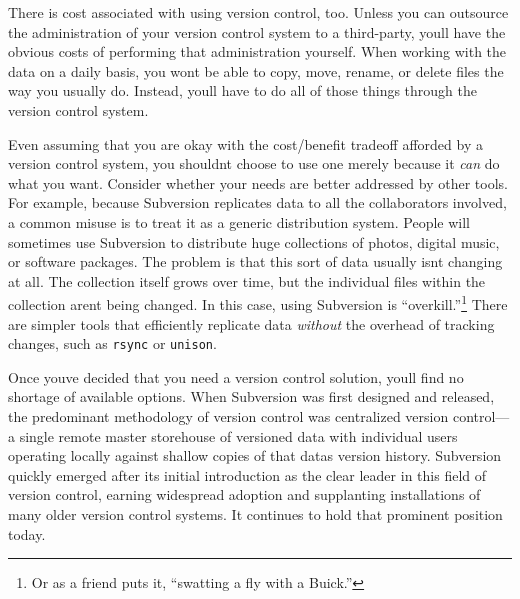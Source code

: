 There is cost associated with using version control, too. Unless you can
outsource the administration of your version control system to a
third-party, you\textquotesingle ll have the obvious costs of performing
that administration yourself. When working with the data on a daily
basis, you won\textquotesingle t be able to copy, move, rename, or
delete files the way you usually do. Instead, you\textquotesingle ll
have to do all of those things through the version control system.

Even assuming that you are okay with the cost/benefit tradeoff afforded
by a version control system, you shouldn\textquotesingle t choose to use
one merely because it \emph{can} do what you want. Consider whether your
needs are better addressed by other tools. For example, because
Subversion replicates data to all the collaborators involved, a common
misuse is to treat it as a generic distribution system. People will
sometimes use Subversion to distribute huge collections of photos,
digital music, or software packages. The problem is that this sort of
data usually isn\textquotesingle t changing at all. The collection
itself grows over time, but the individual files within the collection
aren\textquotesingle t being changed. In this case, using Subversion is
``overkill.''\footnote{Or as a friend puts it, ``swatting a fly with a
  Buick.''} There are simpler tools that efficiently replicate data
\emph{without} the overhead of tracking changes, such as \texttt{rsync}
or \texttt{unison}.

Once you\textquotesingle ve decided that you need a version control
solution, you\textquotesingle ll find no shortage of available options.
When Subversion was first designed and released, the predominant
methodology of version control was centralized version control---a
single remote master storehouse of versioned data with individual users
operating locally against shallow copies of that data\textquotesingle s
version history. Subversion quickly emerged after its initial
introduction as the clear leader in this field of version control,
earning widespread adoption and supplanting installations of many older
version control systems. It continues to hold that prominent position
today.

